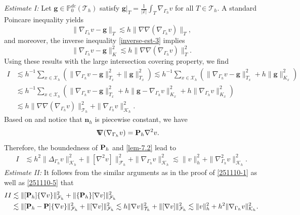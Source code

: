 \documentclass[10pt, a4paper]{amsart}
\newcommand{\bn}{{\bm n}}
\newcommand{\nab}{\nabla}
\newcommand{\calT}{\mathcal{T}}
\newcommand{\calF}{\mathcal{F}}
\newcommand{\calK}{\mathcal{K}}
\newcommand{\calX}{\mathcal{X}}
\newcommand{\Grad}{\nabla\!\!\!\!\nabla}
\newcommand{\bg}{{\bm g}}
\theoremstyle{definition}
\theoremstyle{remark}
\theoremstyle{example}
\numberwithin{equation}{section}
\begin{document}
\textit{Estimate I:} Let $ \bg \in \mathbb{P}_0^{dc}(\calT_h)$ satisfy $\bg|_T = \frac{1}{|T|}\int_T\nab_{\Gamma_h}v$ for all $T \in \calT_h$. A standard Poincare inequality yields
\[
\|\nab_{\Gamma_h}v - \bg\|_T
\lesssim h\|\Grad(\nab_{\Gamma_h}v)\|_T,
\]
and moreover, the inverse inequality \eqref{inverse-est-3} implies
\[
\|\nab_{\Gamma_h}v - \bg\|_K^2
\lesssim h\|\Grad(\nab_{\Gamma_h}v)\|_T^2.
\]
Using these results with the large intersection covering property, we find
\begin{align*}
I
& \lesssim h^{-1}\sum_{x \in \calX_h}(\|\nab_{\Gamma_h}v - \bg\|_{T_x}^2 + \|\bg\|_{T_x}^2)
\lesssim h^{-1}\sum_{x \in \calX_h}(\|\nab_{\Gamma_h}v - \bg\|_{T_x}^2 + h\|\bg\|_{K_x}^2) \\
& \lesssim h^{-1}\sum_{x \in \calX_h}(\|\nab_{\Gamma_h}v - \bg\|_{T_x}^2 + h\|\bg - \nab_{\Gamma_h}v\|_{K_x}^2 + h\|\nab_{\Gamma_h}v\|_{K_x}^2) \\
& \lesssim h\|\Grad(\nab_{\Gamma_h}v)\|_{\calT_h}^2 + \|\nab_{\Gamma_h}v\|_{\calK_h}^2.
\end{align*}
Based on \cite[(2.5)]{neilan2025c0} and notice that $\bn_h$ is piecewise constant, we have
\begin{align}
\Grad(\nab_{\Gamma_h}v)
& = {\bf P}_h\nab^2v. \label{251110-2}
\end{align}
Therefore, the boundedness of ${\bf P}_h$ and \eqref{lem-7.2} lead to
\begin{align}
I
& \lesssim h^2\|\Delta_{\Gamma_h}v\|_{\calK_h}^2 + \|[\nab^2v]\|_{\calF_h}^2 + \|\nab_{\Gamma_h}v\|_{\calK_h}^2\lesssim \|v\|_h^2 + \|\nab_{\Gamma_h}^2 v\|_{\calK_h}^2. \label{251110-4}
\end{align}
\textit{Estimate II:} It follows from the similar arguments as in the proof of \eqref{251110-1} as well as \eqref{251110-5} that
\begin{equation}\label{IIBound}
\begin{split}
II
&\lesssim \|[{\bf P}_h]\{\nab v\}\|_{\calF_h}^2 + \|\{{\bf P}_h\}[\nab v]\|_{\calF_h}^2\\
&\lesssim \|[{\bf P}_h - {\bf P}]\{\nab v\}\|_{\calF_h}^2 + \|[\nab v]\|_{\calF_h}^2
\lesssim h\|\nab v\|_{\calT_h}^2 + \|[\nab v]\|_{\calF_h}^2
\lesssim \|v\|_{h}^2 + h^2 \|\nab_{\Gamma_h} v\|_{\calK_h}^2.
\end{split}
\end{equation}
\end{document}
